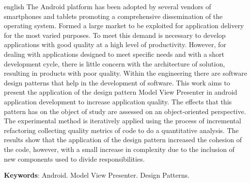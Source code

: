 \documentclass[
	12pt,				%
	a4paper,			%
	oneside,
	english,			%
	brazil,				%
	]{abntex2}
\begin{document}
\begin{resumo}[Abstract]
 \begin{otherlanguage*}{english}
\noindent
The Android platform has been adopted by several vendors of smartphones and
tablets promoting a comprehensive dissemination of the operating system.
Formed a large market to be exploited for application delivery
for the most varied purposes. To meet this demand is necessary to
develop applications with good quality at a high level of productivity.
However, for dealing with applications designed to meet specific needs and with a
short development cycle, there is little concern with the architecture of
solution, resulting in products with poor quality. Within the engineering
there are software design patterns that help in the development of software.
This work aims to present the application of the design pattern
Model View Presenter in android application development to increase
application quality. The effects that this pattern has on the object of study
are assessed on an object-oriented perspective. The experimental method is
iteratively applied using the process of incremental refactoring
collecting quality metrics of code to do a quantitative analysis.
The results show that the application of the design pattern increased the
cohesion of the code, however, with a small increase in complexity due to the
inclusion of new components used to divide responsibilities.

 \vspace{\onelineskip}

 \noindent
 \textbf{Keywords}: Android. Model View Presenter. Design Patterns.
 \end{otherlanguage*}
\end{resumo}


\listoffigures*
\cleardoublepage

\listoftables*
\cleardoublepage
\end{document}
